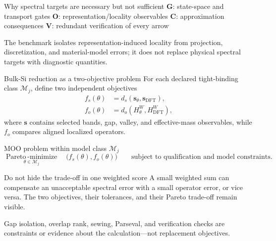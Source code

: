 \documentclass[aspectratio=169,10pt]{beamer}
\begin{document}
\begin{frame}{Why spectral targets are necessary but not sufficient}
  \vspace{0.35em}
  \scriptsize
  \textbf{G}: state-space and transport gates\quad
  \textbf{O}: representation/locality observables\quad
  \textbf{C}: approximation consequences\quad
  \textbf{V}: redundant verification of every arrow

  \vspace{0.25em}
  The benchmark isolates representation-induced locality from projection,
  discretization, and material-model errors; it does not replace physical spectral
  targets with diagnostic quantities.
\end{frame}

\begin{frame}{Bulk-Si reduction as a two-objective problem}
  \small
  For each declared tight-binding class $\mathcal M_j$, define two independent objectives
  \begin{align*}
    f_s(\theta)
      &=d_s\!\left(\mathbf s_\theta,\mathbf s_{\mathrm{DFT}}\right),\\
    f_o(\theta)
      &=d_o\!\left(H_\theta^W,H_{\mathrm{DFT}}^W\right),
  \end{align*}
  where $\mathbf s$ contains selected bands, gap, valley, and effective-mass observables,
  while $f_o$ compares aligned localized operators.

  \begin{block}{MOO problem within model class $\mathcal M_j$}
    \[
      \underset{\theta\in\mathcal M_j}{\operatorname{Pareto\!\!-minimize}}
      \quad \bigl(f_s(\theta),f_o(\theta)\bigr)
      \qquad\text{subject to qualification and model constraints.}
    \]
  \end{block}

  \begin{alertblock}{Do not hide the trade-off in one weighted score}
    A small weighted sum can compensate an unacceptable spectral error with a small
    operator error, or vice versa. The two objectives, their tolerances, and their Pareto
    trade-off remain visible.
  \end{alertblock}

  Gap isolation, overlap rank, sewing, Parseval, and verification checks are constraints
  or evidence about the calculation---not replacement objectives.
\end{frame}
\end{document}
